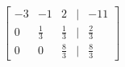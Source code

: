 \documentclass[preview]{standalone}
\begin{document}
\begin{align*}
\begin{bmatrix} -3 & -1 & 2 & | & -11 \\ 0 & \frac{1}{3} & \frac{1}{3} & | & \frac{2}{3} \\ 0 & 0 & \frac{8}{3} & | & \frac{8}{3} \end{bmatrix}
\end{align*}
\end{document}
